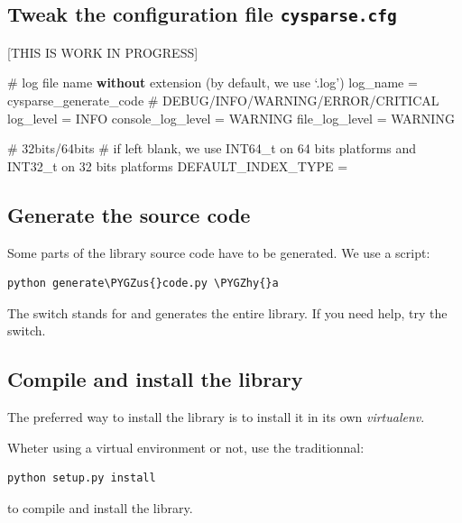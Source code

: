 \documentclass[letterpaper,10pt,english]{sphinxmanual}
\def\PYGZus{\char`\_}
\def\PYGZhy{\char`\-}
\begin{document}
\subsection{Tweak the configuration file \texttt{cysparse.cfg}}
\label{installation:tweak-the-configuration-file-cysparse-cfg}
{[}THIS IS WORK IN PROGRESS{]}

\# log file name \textbf{without} extension (by default, we use `.log')
log\_name = cysparse\_generate\_code
\# DEBUG/INFO/WARNING/ERROR/CRITICAL
log\_level = INFO
console\_log\_level = WARNING
file\_log\_level = WARNING

\# 32bits/64bits
\# if left blank, we use INT64\_t on 64 bits platforms and INT32\_t on 32 bits platforms
DEFAULT\_INDEX\_TYPE =


\subsection{Generate the source code}
\label{installation:generate-the-source-code}
Some parts of the library source code have to be generated. We use a script:

\begin{Verbatim}[commandchars=\\\{\}]
python generate\PYGZus{}code.py \PYGZhy{}a
\end{Verbatim}

The switch  stands for  and generates the entire library. If you need help, try the  switch.


\subsection{Compile and install the library}
\label{installation:compile-and-install-the-library}
The preferred way to install the library is to install it in its own \emph{virtualenv}.

Wheter using a virtual environment or not, use the traditionnal:

\begin{Verbatim}[commandchars=\\\{\}]
python setup.py install
\end{Verbatim}

to compile and install the library.
\end{document}
